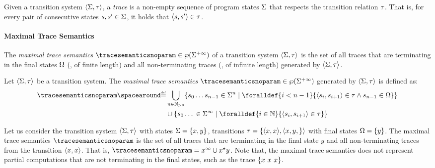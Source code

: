 Given a transition system $\langle \Sigma, \tau \rangle$, a \emph{trace} is a non-empty sequence of program states $\Sigma$ that respects the transition relation $\tau$. That is, for every pair of consecutive states $s, s' \in \Sigma$, it holds that $\langle s, s' \rangle \in \tau$.

\paragraph{Maximal Trace Semantics}

The \emph{maximal trace semantics} $\tracesemanticsnoparam\in\tracetype$ of a transition system $\langle \Sigma, \tau \rangle$ is the set of all traces that are terminating in the final states $\Omega$ (\ie, of finite length) and all non-terminating traces (\ie, of infinite length) generated by $\langle \Sigma, \tau \rangle$.


\begin{definition}
  Let $\langle \Sigma, \tau \rangle$ be a transition system. The \emph{maximal trace semantics} $\tracesemanticsnoparam\in\tracetype$ generated by $\langle \Sigma, \tau \rangle$ is defined as:
  \begin{align*}
    \tracesemanticsnoparam \DefeQ &\bigsetjoin_{n\in\Nposstrict} \setdef{s_0\dots s_{n-1}\in\finitetontraces}{\foralldef{i < n-1}{\tuple{s_i}{s_{i+1}}\in\transitionrelation \land s_{n-1}\in \finalstates}} \\
    &\setjoin \setdef{s_0\dots{}\in\infinitesequences}{\foralldef{i\in\N}{\tuple{s_i}{s_{i+1}}\in\transitionrelation}}
  \end{align*}
\end{definition}

\begin{example}
  Let us consider the transition system $\langle \Sigma, \tau \rangle$ with states $\Sigma = \{x, y\}$, transitions $\tau = \{\langle x, x \rangle, \langle x, y, \} \rangle$ with final states $\Omega = \{y\}$. The maximal trace semantics $\tracesemanticsnoparam$ is the set of all traces that are terminating in the final state $y$ and all non-terminating traces from the transition $\langle x, x \rangle$.
  That is, $\tracesemanticsnoparam = \retrieveinfinitetraces{x} \setjoin {\retrievefiniteoremptytraces{x}}{y}$.
  Note that, the maximal trace semantics does not represent partial computations that are not terminating in the final states, such as the trace $\{x~ x~ x\}$.
\end{example}


